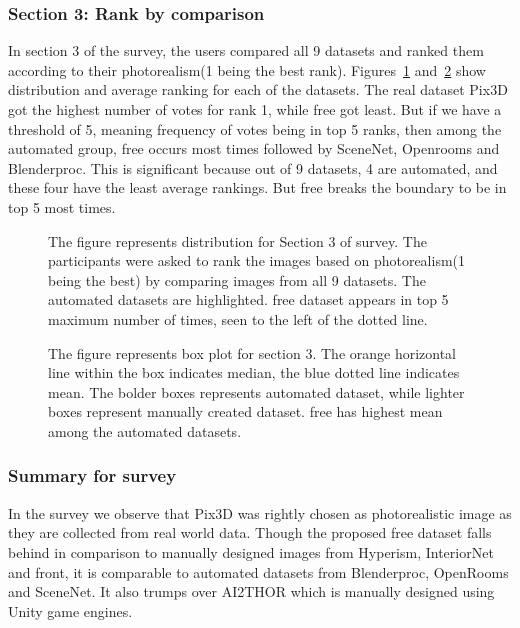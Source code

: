 \subsubsection{Section 3: Rank by comparison}
In section 3 of the survey, the users compared all 9 datasets and ranked them according to their photorealism(1 being the best rank).
Figures~\ref{fig:question3} and~\ref{fig:question3_2} show distribution and average ranking for each of the datasets.
The real dataset Pix3D got the highest number of votes for rank 1, while \gls{free} got least.
But if we have a threshold of 5, meaning frequency of votes being in top 5 ranks, then among the automated group, \gls{free} occurs most times followed by SceneNet, Openrooms and Blenderproc.
This is significant because out of 9 datasets, 4 are automated, and these four have the least average rankings.
But \gls{free} breaks the boundary to be in top 5 most times.

\begin{figure}
    \centering
    \resizebox{\textwidth}{!}{}
    \caption{The figure represents distribution for Section 3 of survey. The participants were asked to rank the images based on photorealism(1 being the best) by comparing images from all 9 datasets.
    The automated datasets are highlighted. \gls{free} dataset appears in top 5 maximum number of times, seen to the left of the dotted line.}
    \label{fig:question3}
\end{figure}

\begin{figure}
    \centering
    \resizebox{0.75\textwidth}{!}{}
    \caption{The figure represents box plot for section 3. The orange horizontal line within the box indicates median, the blue dotted line indicates mean.
    The bolder boxes represents automated dataset, while lighter boxes represent manually created dataset. \Gls{free} has highest mean among the automated datasets.}
    \label{fig:question3_2}
\end{figure}

\subsubsection{Summary for survey}
In the survey we observe that Pix3D was rightly chosen as photorealistic image as they are collected from real world data.
Though the proposed \gls{free} dataset falls behind in comparison to manually designed images from Hyperism, InteriorNet and \gls{front},
it is comparable to automated datasets from Blenderproc, OpenRooms and SceneNet.
It also trumps over AI2THOR which is manually designed using Unity game engines.


